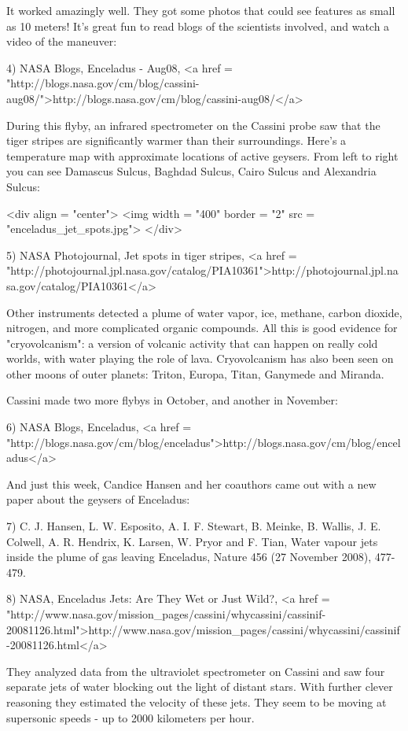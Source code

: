 It worked amazingly well.  They got some photos that could see 
features as small as 10 meters!  It's great fun to read blogs of
the scientists involved, and watch a video of the maneuver:

4) NASA Blogs, Enceladus - Aug08,
<a href = "http://blogs.nasa.gov/cm/blog/cassini-aug08/">http://blogs.nasa.gov/cm/blog/cassini-aug08/</a>

During this flyby, an infrared spectrometer on the Cassini probe 
saw that the tiger stripes are significantly warmer than their 
surroundings.  Here's a temperature map with approximate locations
of active geysers.  From left to right you can see Damascus Sulcus, 
Baghdad Sulcus, Cairo Sulcus and Alexandria Sulcus:

<div align = "center">
<img width = "400" border = "2" src = "enceladus_jet_spots.jpg">
</div>

5) NASA Photojournal, Jet spots in tiger stripes,
<a href = "http://photojournal.jpl.nasa.gov/catalog/PIA10361">http://photojournal.jpl.nasa.gov/catalog/PIA10361</a>

Other instruments detected a plume of water vapor, ice,
methane, carbon dioxide, nitrogen, and more complicated
organic compounds.    All this is good evidence for
"cryovolcanism": a version of volcanic activity that can happen on 
really cold worlds, with water playing the role of lava.  
Cryovolcanism has also been seen on other moons of outer planets: 
Triton, Europa, Titan, Ganymede and Miranda.

Cassini made two more flybys in October, and another in November:

6) NASA Blogs, Enceladus,
<a href = "http://blogs.nasa.gov/cm/blog/enceladus">http://blogs.nasa.gov/cm/blog/enceladus</a>

And just this week, Candice Hansen and her coauthors came out with 
a new paper about the geysers of Enceladus:

7) C. J. Hansen, L. W. Esposito, A. I. F. Stewart, B. Meinke, B. 
Wallis, J. E. Colwell, A. R. Hendrix, K. Larsen, W. Pryor and F. Tian, 
Water vapour jets inside the plume of gas leaving Enceladus, Nature 
456 (27 November 2008), 477-479.

8) NASA, Enceladus Jets: Are They Wet or Just Wild?,
<a href = "http://www.nasa.gov/mission_pages/cassini/whycassini/cassinif-20081126.html">http://www.nasa.gov/mission_pages/cassini/whycassini/cassinif-20081126.html</a>

They analyzed data from the ultraviolet spectrometer on Cassini and 
saw four separate jets of water blocking out the light of distant
stars.  With further clever reasoning they estimated the velocity of 
these jets.  They seem to be moving at supersonic speeds - up to 2000
kilometers per hour.  

